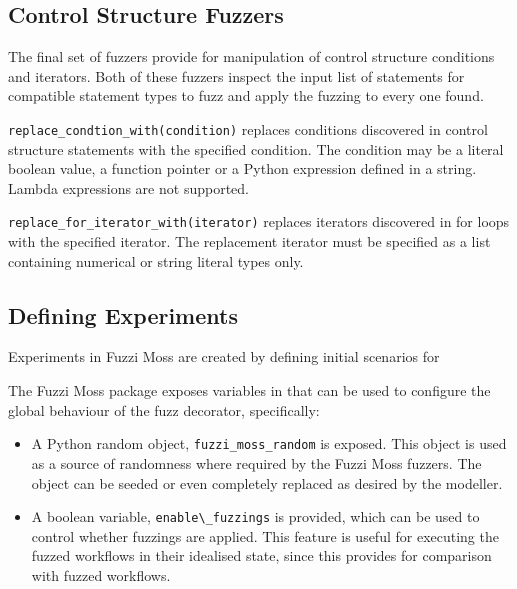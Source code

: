 \documentclass{sig-alternate}
\newenvironment{FunctionList}{%
\lstset{basicstyle=\ttfamily\bfseries\small}
\begin{list}{}{\leftmargin=5pt}
}{\end{list}\lstset{basicstyle=\ttfamily\small}}
\begin{document}

\subsection{Control Structure Fuzzers}


The final set of fuzzers provide for manipulation of control structure
conditions and iterators.  Both of these fuzzers inspect the input list of
statements for compatible statement types to fuzz and apply the fuzzing to every
one found.

\begin{FunctionList}

\item \lstinline!replace_condtion_with(condition)! replaces conditions
  discovered in control structure statements with the specified condition.  The
  condition may be a literal boolean value, a function pointer or a Python
  expression defined in a string.  Lambda expressions are not supported.

\item \lstinline!replace_for_iterator_with(iterator)! replaces iterators
  discovered in for loops with the specified iterator.  The replacement iterator
  must be specified as a list containing numerical or string literal types only.

\end{FunctionList}


\subsection{Defining Experiments}


Experiments in Fuzzi Moss are created by defining initial scenarios for 

The Fuzzi Moss package exposes variables in that can be used to configure the
global behaviour of the fuzz decorator, specifically:

\begin{itemize}
\item A Python random object, \lstinline!fuzzi_moss_random! is exposed.  This
  object is used as a source of randomness where required by the Fuzzi Moss
  fuzzers.  The object can be seeded or even completely replaced as desired by
  the modeller.

\item A boolean variable, \lstinline!enable\_fuzzings! is provided, which can be
  used to control whether fuzzings are applied.  This feature is useful for
  executing the fuzzed workflows in their idealised state, since this provides
  for comparison with fuzzed workflows.

\end{itemize}
\end{document}

